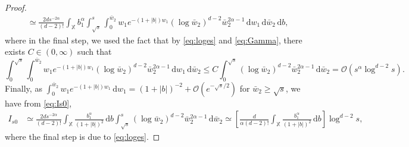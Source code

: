 \documentclass[11pt,reqno]{amsart}
\numberwithin{equation}{section}
\theoremstyle{definition}
\newcommand{\XX}{\mathbb{X}}
\newcommand{\diff}{{\,\mathrm d}}
\begin{document}
\begin{proof}
\begin{align}
			&\simeq \frac{2 d s^{-2\alpha}}{(d-2)!} \int_{\XX } b_1^\alpha \int_{\sqrt{s}}^s \int_{0}^{\bar w_2} w_1  e^{-(1+|b|)w_1} (\log \bar w_2)^{d-2} \bar w_2^{2\alpha-1}  \diff w_1 \diff \bar w_2  \diff b,
		\end{align}
	where in the final step, we used the fact that by \eqref{eq:loges} and \eqref{eq:Gamma}, there exists $C \in (0,\infty)$ such that
	$$
	\int_0^{\sqrt{s}} \int_{0}^{\bar w_2} w_1  e^{-(1+|b|)w_1} (\log \bar w_2)^{d-2} \bar w_2^{2\alpha-1}  \diff w_1 \diff \bar w_2 \le C \int_0^{\sqrt{s}} (\log \bar w_2)^{d-2} \bar w_2^{2\alpha-1} \diff \bar w_2 =\mathcal{O}(s^\alpha \log^{d-2}s).
	$$
		Finally, as $\int_{0}^{\bar w_2}  w_1  e^{-(1+|b|)w_1}\diff w_1=(1+|b|)^{-2}+\mathcal{O}(e^{-\sqrt{s}/2})$ for $\bar w_2 \ge \sqrt{s}$, we have from \eqref{eq:Is0},
		\begin{align*}
			I_{s0}
			&\simeq\frac{2d s^{-2\alpha}}{(d-2)!} \int_{\XX } \frac{b_1^\alpha }{(1+|b|)^{2}} \diff b \int_{\sqrt{s}}^{s} (\log \bar w_2)^{d-2} \bar w_2^{2\alpha-1} \diff \bar w_2\simeq \left[\frac{d}{\alpha(d-2)!} \int_{\XX } \frac{b_1^\alpha }{(1+|b|)^{2}} \diff b\right] \log^{d-2} s,
		\end{align*}
		where the final step is due to \eqref{eq:loges}. 
\end{proof}
\end{document}
